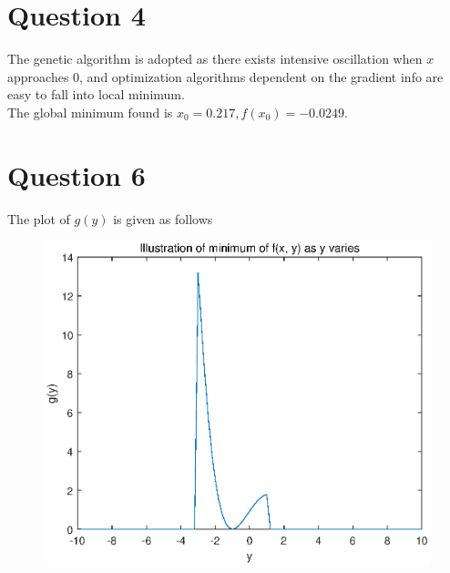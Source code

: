 \documentclass[paper=a4, fontsize=11pt]{scrartcl} %
\numberwithin{equation}{section} %
\numberwithin{figure}{section} %
\numberwithin{table}{section} %
\begin{document}
\section{Question 4}
	The genetic algorithm is adopted as there exists intensive oscillation when $x$ approaches $0$, and optimization algorithms dependent on the gradient info are easy to fall into local minimum.\\
	The global minimum found is $x_0=0.217, f(x_0)=-0.0249$.
	
\section{Question 6}
	The plot of $g(y)$ is given as follows
	\begin{figure}[!htbp]
		\centering
		\includegraphics[width=15cm]{../pic/Task6.eps}
	\end{figure}
\end{document}
